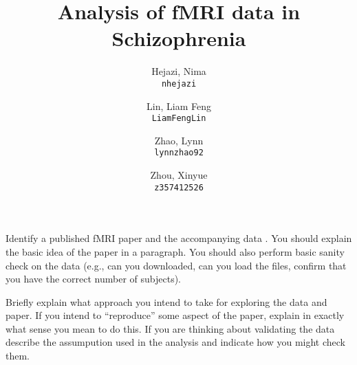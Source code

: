 \documentclass[11pt]{article}
\title{Analysis of fMRI data in Schizophrenia}
\author{
  Hejazi, Nima\\
  \texttt{nhejazi}
  \and
  Lin, Liam Feng\\
  \texttt{LiamFengLin}
  \and
  Zhao, Lynn\\
  \texttt{lynnzhao92}
  \and
  Zhou, Xinyue\\
  \texttt{z357412526}
}
\begin{document}
\maketitle

Identify a published fMRI paper and the accompanying data
\cite{lindquist2008statistical}.  You should explain the basic idea of the
paper in a paragraph.  You should also perform basic sanity check on the data
(e.g., can you downloaded, can you load the files, confirm that you have the
correct number of subjects).

Briefly explain what approach you intend to take for exploring
the data and paper.  If you intend to ``reproduce'' some aspect of the paper,
explain in exactly what sense you mean to do this.  If you are thinking about
validating the data describe the assumpution used in the analysis and indicate
how you might check them.


\end{document}
